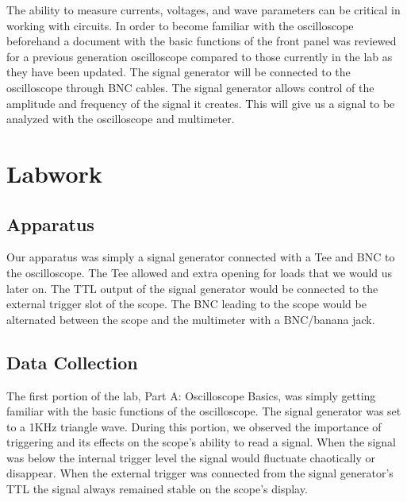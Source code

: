 \documentclass[11pt,letterpaper,onecolumn]{article}
\begin{document}
The ability to measure currents, voltages, and wave parameters can be critical in working with circuits. In order to become familiar with the oscilloscope beforehand a document with the basic functions of the front panel was reviewed for a previous generation oscilloscope compared to those currently in the lab as they have been updated. The signal generator will be connected to the oscilloscope through BNC cables. The signal generator allows control of the amplitude and frequency of the signal it creates. This will give us a signal to be analyzed with the oscilloscope and multimeter.     

\section{Labwork}


\subsection{Apparatus}

Our apparatus was simply a signal generator connected with a Tee and BNC to the oscilloscope. The Tee allowed and extra opening for loads that we would us later on. The TTL output of the signal generator would be connected to the external trigger slot of the scope. The BNC leading to the scope would be alternated between the scope and the multimeter with a BNC/banana jack.






\subsection{Data Collection}

The first portion of the lab, Part A: Oscilloscope Basics, was simply getting familiar with the basic functions of the oscilloscope. The signal generator was set to a 1KHz triangle wave. During this portion, we observed the importance of triggering and its effects on the scope's ability to read a signal. When the signal was below the internal trigger level the signal would fluctuate chaotically or disappear. When the external trigger was connected from the signal generator's TTL the signal always remained stable on the scope's display.
\end{document}
